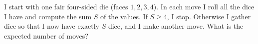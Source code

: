 I start with one fair four-sided die (faces $1,2,3,4$). In each move I roll all the dice I have and compute the sum $S$ of the values. If $S\ge4$, I stop. Otherwise I gather dice so that I now have exactly $S$ dice, and I make another move. What is the expected number of moves?
